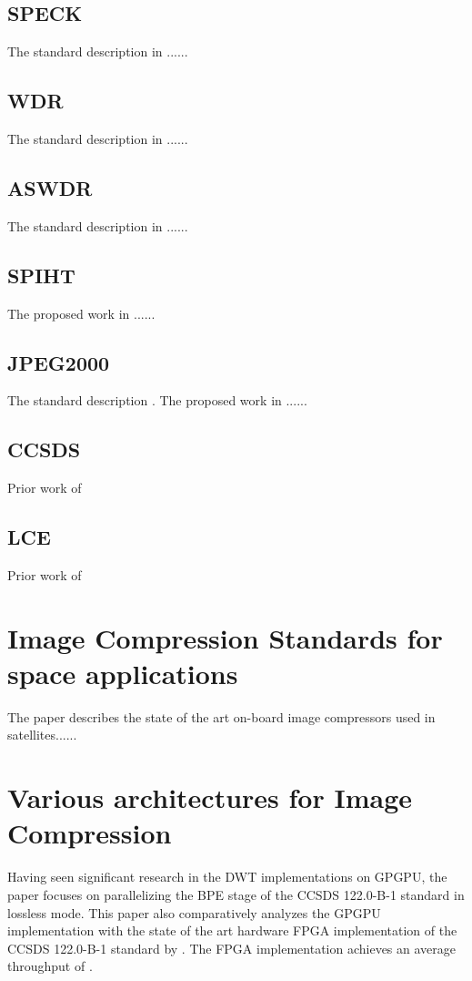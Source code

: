 \subsection{\gls{SPECK}\label{speck}}
The standard description in \cite{Pearlman2004} ......
\subsection{\gls{WDR}\label{wdr}}
The standard description in \cite{JunTian} ......
\subsection{\gls{ASWDR}\label{aswdr}}
The standard description in \cite{Walker2000} ......
\subsection{\gls{SPIHT}\label{spiht}}
The proposed work in \cite{Said1996} ......
\subsection{\gls{JPEG2000}\label{j2000}}
The standard description \cite{ITU2004,Christopoulos2000}. The proposed work in \cite{Kurowski2012} ......
\subsection{\gls{CCSDS}\label{ccsds}}
Prior work of \cite{CCSDS122blue,CCSDS122green}
\subsection{\gls{LCE}\label{lce}}
Prior work of \cite{Garcia2014}
\section{Image Compression Standards for space applications\label{sec:2.3}}
The paper \cite{Yu2009} describes the state of the art on-board image compressors used in satellites......
\section{Various architectures for Image Compression\label{sec:2.4}}
Having seen significant research in the \gls{DWT} implementations on \gls{GPGPU}, the paper focuses on parallelizing the \gls{BPE} stage of the \gls{CCSDS} 122.0-B-1 standard in lossless mode. This paper also comparatively analyzes the \gls{GPGPU} implementation with the state of the art hardware \gls{FPGA} implementation of the CCSDS 122.0-B-1 standard by \cite{Manthey2014}. The FPGA implementation achieves an average throughput of .
